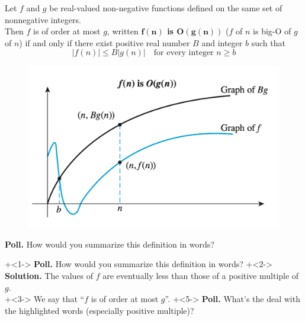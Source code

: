 \documentclass[10pt]{beamer}
\begin{document}
\begin{frame}
\small 
\begin{mygreenbox}[title=Definition]
Let $f$ and $g$ be real-valued non-negative functions defined on the same set of nonnegative integers. \\

Then $f$ is of order at most $g$, written \textbf{$\bm{f(n)}$ is $\bm{O(g(n))}$} ($f$ of $n$ is big-O of $g$ of $n$) if and only if there exist positive real number $B$ and integer $b$ such that
\[  |f(n)| \leq B |g(n)| \quad \text{for every integer } n \geq b\]	
\end{mygreenbox}
\vfill 
\begin{figure}
\includegraphics[width=.6\textwidth]{images/big_O.png}
\end{figure}
\pause \vfill 
\colorbox{yellow!30}{\textbf{Poll.}} How would you summarize this definition in words?
\end{frame}

\begin{frame}

\onslide+<1-> \colorbox{yellow!30}{\textbf{Poll.}} How would you summarize this definition in words?
\vfill 
\onslide+<2-> \colorbox{green!30}{\textbf{Solution.}}
The values of $f$ are  \alert<4->{eventually} less than those of a \alert<4->{positive multiple} of $g$.  \\
\vfill 
\onslide+<3->  We say that \enquote{$f$ is of order at most $g$}.
\vfill 
\onslide+<5->
\colorbox{yellow!30}{\textbf{Poll.}} What's the deal with the highlighted words (especially \alert{positive multiple})?
\end{frame}
\end{document}

